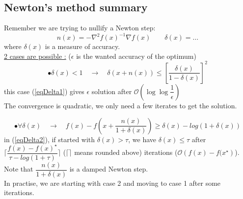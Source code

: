 \subsection{Newton's method summary}
Remember we are trying to nullify a Newton step:
$$n(x) = - \nabla^2 f(x)^{-1} \nabla f(x) \qquad \delta (x) = \dots $$
where $\delta (x)$ is a measure of accuracy.\\
\underline{2 cases are possible :} ($\epsilon$ is the wanted accuracy of the optimum)
\begin{equation}
\label{eqDelta1}
 \bullet\delta (x) < 1 \quad \rightarrow \quad \delta (x + n(x)) \leq \left[ \dfrac{\delta (x)}{1 - \delta (x)} \right]^2 
\end{equation}
this case (\ref{eqDelta1}) gives $\epsilon$ solution after $\mathcal{O} (\log \log \dfrac{1}{\epsilon})$\\
The convergence is quadratic, we only need a few iterates to get the solution.

\begin{equation}
\label{eqDelta2}
\bullet\forall \delta(x) \quad \rightarrow \quad f(x) - f\left(x + \dfrac{n(x)}{1 + \delta(x)}\right) \geq \delta(x) - log(1 + \delta(x))
\end{equation}
in (\ref{eqDelta2}), if started with $\delta(x) > \tau $, we have $\delta(x) \leq \tau$ after $\lceil\dfrac{f(x) - f(x)^{\star}}{\tau - log(1 + \tau)}\rceil$ ($\lceil \rceil$ means rounded above) iterations ($\mathcal{O}\left(f(x)-f(x^{\star}\right)$). \\
Note that $\dfrac{n(x)}{1 + \delta(x)}$ is a damped Newton step.\\
In practise, we are starting with case 2 and moving to case 1 after some iterations.

